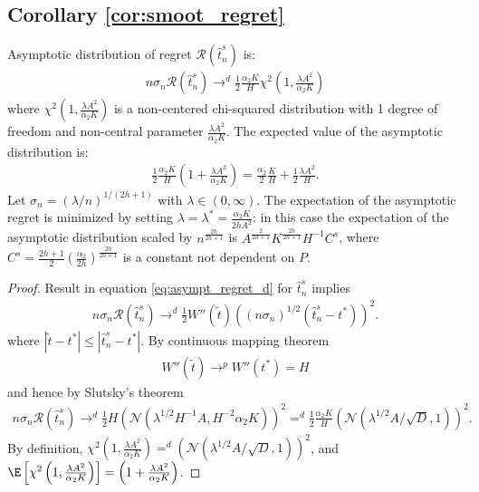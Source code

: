 {\subsection*{Corollary \ref{cor:smoot_regret}}
\begin{corollary} \label{cor:smoot_regret}
    Asymptotic distribution of regret $\mathcal{R}(\hat{t}^s_n)$ is:
    \begin{gather*}
        n \sigma_n \mathcal{R}(\hat{t}^s_n) \rightarrow^d  \frac{1}{2} \frac{\alpha_2 K}{H} \chi^2\left(1,\frac{\lambda A^2}{\alpha_2 K}\right)
    \end{gather*}
    where $\chi^2\left(1,\frac{\lambda A^2}{\alpha_2 K}\right)$ is a non-centered chi-squared distribution with 1 degree of freedom and non-central parameter $\frac{\lambda A^2}{\alpha_2 K}$.
    The expected value of the asymptotic distribution is:
    \begin{align} \label{eq:expregretswm}
        \frac{1}{2} \frac{\alpha_2 K}{H} \left(1 + \frac{\lambda A^2}{\alpha_2 K} \right) =  \frac{\alpha_2}{2} \frac{ K}{H} + \frac{1}{2} \frac{\lambda A^2}{H}.
    \end{align}
    Let $\sigma_n = (\lambda/n)^{1/(2h +1)}$ with $\lambda \in (0, \infty)$. The expectation of the asymptotic regret is minimized by setting $\lambda = \lambda^* = \frac{\alpha_2 K}{2hA^2 }$: in this case the expectation of the asymptotic distribution scaled by $n^\frac{2h}{2h+1}$ is $ A^{\frac{2}{2h+1}} K^{\frac{2h}{2h+1}} H^{-1} C^s$, where $C^s = \frac{2h+1}{2} \left( \frac{\alpha_2}{2h} \right)^\frac{2h}{2h+1}$ is a constant not dependent on $P$.
\end{corollary}

\begin{proof}
    Result in equation \eqref{eq:asympt_regret_d} for $\hat{t}^s_n$ implies
    \begin{gather*}
        n\sigma_n \mathcal{R}(\hat{t}^s_n) \rightarrow^d \frac{1}{2} W''(\tilde{t}) \left( (n\sigma_n)^{1/2} \left(\hat{t}^s_n-t^*\right) \right)^2.
    \end{gather*}
    where $|\tilde{t}-t^*| \leq |\hat{t}^s_n - t^*|$. By continuous mapping theorem
    \begin{gather*}
        W''(\tilde{t}) \rightarrow^p W''(t^*) = H
    \end{gather*}
    and hence by Slutsky's theorem
    \begin{gather*}
    n\sigma_n \mathcal{R}(\hat{t}^s_n) \rightarrow^d \frac{1}{2} H \left(\mathcal{N}(\lambda^{1/2}H^{-1}A, H^{-2}\alpha_2 K) \right)^2 =^d \frac{1}{2} \frac{\alpha_2 K}{H} \left(\mathcal{N}(\lambda^{1/2}A/\sqrt{D}, 1) \right)^2.
     \end{gather*}
     By definition, $\chi^2\left(1,\frac{\lambda A^2}{\alpha_2 K}\right) =^d \left(\mathcal{N}(\lambda^{1/2}A/\sqrt{D}, 1) \right)^2$, and $\E\left[\chi^2\left(1,\frac{\lambda A^2}{\alpha_2 K}\right)\right] = \left(1 + \frac{\lambda A^2}{\alpha_2 K} \right)$.


\end{proof}}
